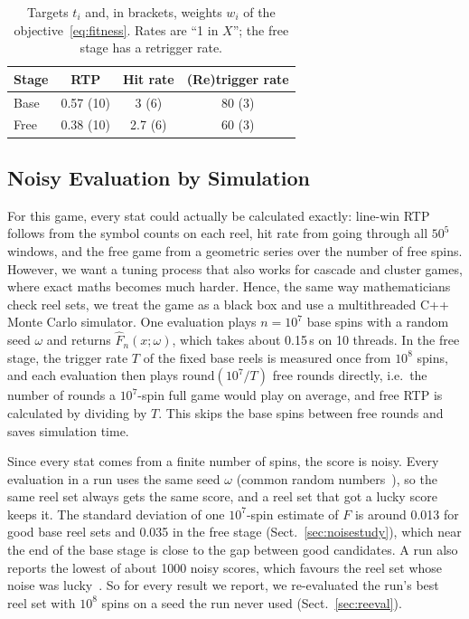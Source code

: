 \begin{table}[t]
\centering
\caption{Targets $t_i$ and, in brackets, weights $w_i$ of the objective~\eqref{eq:fitness}. Rates are ``1 in $X$''; the free stage has a retrigger rate.}
\label{tab:targets}
\begin{tabular}{@{}lccc@{}}
\toprule
Stage & RTP & Hit rate & (Re)trigger rate \\
\midrule
Base & 0.57 (10) & 3 (6)   & 80 (3) \\
Free & 0.38 (10) & 2.7 (6) & 60 (3) \\
\bottomrule
\end{tabular}
\end{table}

\subsection{Noisy Evaluation by Simulation}
\label{sec:noise}

For this game, every stat could actually be calculated exactly: line-win RTP follows from the symbol counts on each reel, hit rate from going through all $50^5$ windows, and the free game from a geometric series over the number of free spins. However, we want a tuning process that also works for cascade and cluster games, where exact maths becomes much harder. Hence, the same way mathematicians check reel sets, we treat the game as a black box and use a multithreaded C++ Monte Carlo simulator. One evaluation plays $n = 10^7$ base spins with a random seed $\omega$ and returns $\hat F_n(x;\omega)$, which takes about 0.15\,s on 10 threads. In the free stage, the trigger rate $T$ of the fixed base reels is measured once from $10^8$ spins, and each evaluation then plays $\mathrm{round}(10^7/T)$ free rounds directly, i.e.\ the number of rounds a $10^7$-spin full game would play on average, and free RTP is calculated by dividing by $T$. This skips the base spins between free rounds and saves simulation time.

Since every stat comes from a finite number of spins, the score is noisy. Every evaluation in a run uses the same seed $\omega$ (common random numbers~\cite{law2015simulation}), so the same reel set always gets the same score, and a reel set that got a lucky score keeps it. The standard deviation of one $10^7$-spin estimate of $F$ is around 0.013 for good base reel sets and 0.035 in the free stage (Sect.~\ref{sec:noisestudy}), which near the end of the base stage is close to the gap between good candidates. A run also reports the lowest of about 1000 noisy scores, which favours the reel set whose noise was lucky~\cite{jin2005evolutionary,rakshit2017noisy}. So for every result we report, we re-evaluated the run's best reel set with $10^8$ spins on a seed the run never used (Sect.~\ref{sec:reeval}).

